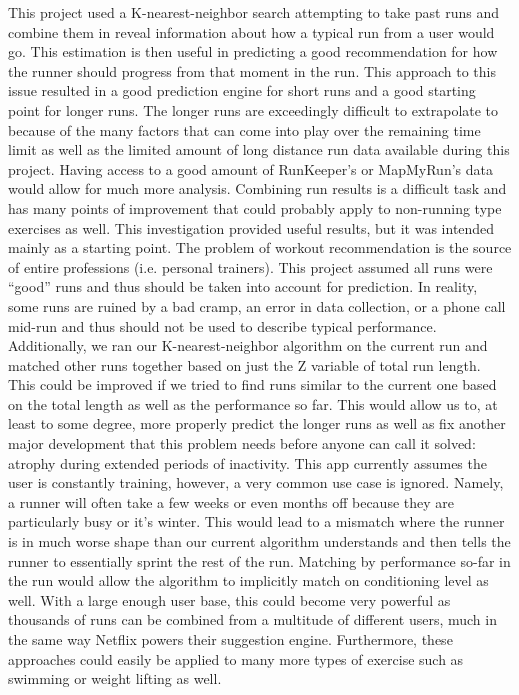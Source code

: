\documentclass[twoside]{article}
\begin{document}
\begin{multicols}{2}
\indent This project used a K-nearest-neighbor search attempting to take past runs and combine them in reveal information about how a typical run from a user would go. This estimation is then useful in predicting a good recommendation for how the runner should progress from that moment in the run. This approach to this issue resulted in a good prediction engine for short runs and a good starting point for longer runs. The longer runs are exceedingly difficult to extrapolate to because of the many factors that can come into play over the remaining time limit as well as the limited amount of long distance run data available during this project. Having access to a good amount of RunKeeper’s or MapMyRun’s data would allow for much more analysis. Combining run results is a difficult task and has many points of improvement that could probably apply to non-running type exercises as well. 
	This investigation provided useful results, but it was intended mainly as a starting point. The problem of workout recommendation is the source of entire professions (i.e. personal trainers). This project assumed all runs were “good” runs and thus should be taken into account for prediction. In reality, some runs are ruined by a bad cramp, an error in data collection, or a phone call mid-run and thus should not be used to describe typical performance. Additionally, we ran our K-nearest-neighbor algorithm on the current run and matched other runs together based on just the Z variable of total run length. This could be improved if we tried to find runs similar to the current one based on the total length as well as the performance so far. This would allow us to, at least to some degree, more properly predict the longer runs as well as fix another major development that this problem needs before anyone can call it solved: atrophy during extended periods of inactivity. This app currently assumes the user is constantly training, however, a very common use case is ignored. Namely, a runner will often take a few weeks or even months off because they are particularly busy or it’s winter. This would lead to a mismatch where the runner is in much worse shape than our current algorithm understands and then tells the runner to essentially sprint the rest of the run. Matching by performance so-far in the run would allow the algorithm to implicitly match on conditioning level as well. With a large enough user base, this could become very powerful as thousands of runs can be combined from a multitude of different users, much in the same way Netflix powers their suggestion engine. Furthermore, these approaches could easily be applied to many more types of exercise such as swimming or weight lifting as well. 

\end{multicols}
\end{document}
